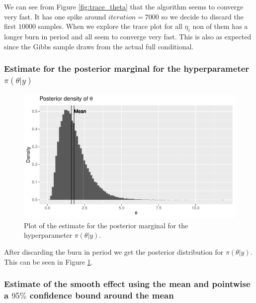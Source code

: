 We can see from Figure \ref{fig:trace_theta} that the algorithm seems to converge very fast. It has one spike around $iteration= 7000$ so we decide to discard the first $10 000$ samples. When we explore the trace plot for all $\eta_i$ non of them has a longer burn in period and all seem to converge very fast. This is also as expected since the Gibbs sample draws from the actual full conditional. 

\subsubsection{Estimate for the posterior marginal for the hyperparameter $\pi(\theta|y)$}

\begin{figure}[h!]
    \centering
    \includegraphics[width=\textwidth]{Images/post_theta_mcmc.pdf}
    \caption{Plot of the estimate for the posterior marginal for the hyperparameter $\pi(\theta|y)$.}
    \label{fig:post_theta_mcmc}
\end{figure}

After discarding the burn in period we get the posterior distribution for $\pi(\theta|y)$. This can be seen in Figure \ref{fig:post_theta_mcmc}. 

\subsubsection{Estimate of the smooth effect using the mean and pointwise a $95 \%$ confidence bound around the mean}


